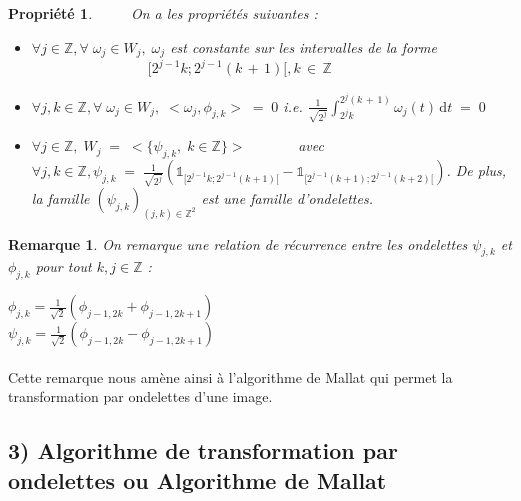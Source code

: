 \documentclass[a4paper,10pt]{report}
\theoremstyle{break}
\newtheorem{Prop}{Propri\'{e}t\'{e}}
\newtheorem{Rem}{Remarque}
\begin{document}
    \begin{Prop}
	$\phantom{Prop}$ On a les propri\'{e}t\'{e}s suivantes :
	\begin{itemize}
	  \item[.] $ \forall j \in \mathbb{Z}, \forall \; \omega_j \in W_j, \; \omega_j $ est constante sur les intervalles de la forme \newline 
	    $\phantom{\forall j \in \mathbb{Z}, \forall \; \omega_j \in W_j,}  [2^{j - 1} k; 2^{j - 1} (k \, + \, 1) [, k \, \in \, \mathbb{Z} $
	  \item[.] $ \forall j, k \in \mathbb{Z}, \forall \; \omega_j \in W_j, \; < \omega_j, \phi_{j, k} > \; = \; 0 $ 
	    i.e. $ \frac{1}{\sqrt{2^j}} \int_{2^j k}^{2^j (k \, + \, 1)} \omega_j(t) \, \mathrm{d} t \; = \; 0 $
	  \item[.] $ \forall j \in \mathbb{Z}, \; W_j \; = \; <\{ \psi_{j,k}, \; k \in \mathbb{Z} \}> $ \newline
	    $\phantom{\forall j \in \mathbb{Z} }$ avec $ \forall j, k \in \mathbb{Z}, \psi_{j,k} \; = \; 
		\frac{1}{\sqrt{2^j}} (\mathbb{1}_{[2^{j - 1} k ; 2^{j - 1} (k + 1)[} - \mathbb{1}_{[2^{j - 1} (k + 1) ; 2^{j - 1} (k + 2)[} ) $.
	    De plus, la famille $ (\psi_{j,k})_{(j, k) \in \mathbb{Z}^2} $ est une famille d'ondelettes.
	\end{itemize}
    \end{Prop}

    \begin{Rem} On remarque une relation de r\'{e}currence entre les ondelettes $ \psi_{j,k} $ et $ \phi_{j,k} $ pour tout $ k, j \in \mathbb{Z} $ :
	\begin{center}
	  $ \phi_{j,k} = \frac{1}{\sqrt{2}} (\phi_{j - 1, 2 k} + \phi_{j - 1, 2 k + 1}) $ \\
	  $ \psi_{j,k} = \frac{1}{\sqrt{2}} (\phi_{j - 1, 2 k} - \phi_{j - 1, 2 k + 1}) $
	\end{center}
    \end{Rem}
    
    \paragraph{} Cette remarque nous am\`{e}ne ainsi \`{a} l'algorithme de Mallat qui permet la transformation par ondelettes d'une image.

	
  \subsection*{3) Algorithme de transformation par ondelettes ou Algorithme de Mallat}
\end{document}
